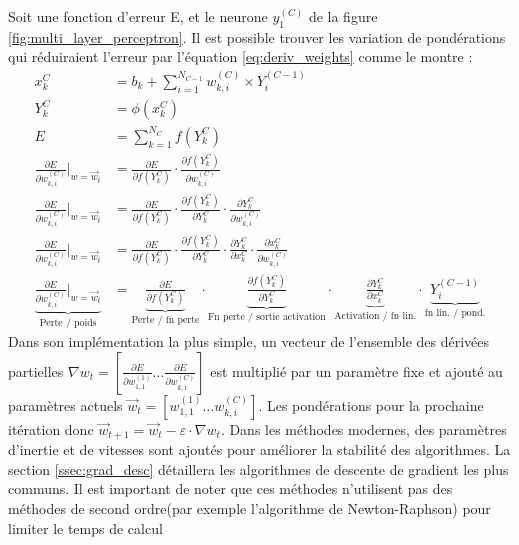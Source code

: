      Soit une fonction d'erreur E, et le neurone $ y^{(C)}_1 $ de la figure \ref{fig:multi_layer_perceptron}. Il est possible trouver les variation de pondérations qui réduiraient l'erreur par l'équation \ref{eq:deriv_weights} comme le montre \textcite{Rumelhart:LearningRepresentations:1986}:
      \begin{align}
        x^{C}_k &= b_k + \sum_{i=1}^{N_{C-1}} w^{(C)}_{k,i} \times Y^{(C-1)}_i\\
        Y^{C}_k &= \phi(x^{C}_k)\\
        E &= \sum^{N_C}_{k=1} f(Y^{C}_k)\\
        \frac{\partial{E}}{\partial{w^{(C)}_{k,i}}}\bigg|_{w=\overrightarrow{w}_{t}} &= \frac{\partial{E}}{\partial{f(Y^{C}_k)}} \cdot \frac{\partial{f(Y^{C}_k)}}{\partial{w^{(C)}_{k,i}}}\\
        \frac{\partial{E}}{\partial{w^{(C)}_{k,i}}}\bigg|_{w=\overrightarrow{w}_{t}} &= \frac{\partial{E}}{\partial{f(Y^{C}_k)}} \cdot \frac{\partial{f(Y^{C}_k)}}{\partial{Y^{C}_k}} \cdot \frac{\partial{Y^{C}_k}}{\partial{w^{(C)}_{k,i}}} \\
        \frac{\partial{E}}{\partial{w^{(C)}_{k,i}}}\bigg|_{w=\overrightarrow{w}_{t}} &= \frac{\partial{E}}{\partial{f(Y^{C}_k)}} \cdot \frac{\partial{f(Y^{C}_k)}}{\partial{Y^{C}_k}} \cdot \frac{\partial{Y^{C}_k}}{\partial{x^{C}_k}} \cdot \frac{\partial{x^{C}_k}}{\partial{w^{(C)}_{k,i}}}\\
        \underbrace{\frac{\partial{E}}{\partial{w^{(C)}_{k,i}}}\bigg|_{w=\overrightarrow{w}_{t}}}_\text{Perte / poids} &= \underbrace{\frac{\partial{E}}{\partial{f(Y^{C}_k)}}}_\text{Perte / fn perte} \cdot \underbrace{\frac{\partial{f(Y^{C}_k)}}{\partial{Y^{C}_k}}}_\text{Fn perte / sortie activation} \cdot \underbrace{\frac{\partial{Y^{C}_k}}{\partial{x^{C}_k}}}_\text{Activation / fn lin.} \cdot \underbrace{Y^{(C-1)}_i}_\text{fn lin. / pond.}\label{eq:deriv_weights}
      \end{align}
    Dans son implémentation la plus simple, un vecteur de l'ensemble des dérivées partielles $\nabla{w_{t}} = \left[ \frac{\partial{E}}{\partial{w^{(1)}_{1,1}}} \ldots \frac{\partial{E}}{\partial{w^{(C)}_{k,i}}} \right] $ est multiplié par un paramètre fixe et ajouté au paramètres actuels $\overrightarrow{w}_{t} = \left[w^{(1)}_{1,1} \ldots w^{(C)}_{k,i}  \right] $. Les pondérations pour la prochaine itération donc $\overrightarrow{w}_{t+1} = \overrightarrow{w}_{t} - \varepsilon \cdot \nabla{w_{t}} $. Dans les méthodes modernes, des paramètres d'inertie et de vitesses sont ajoutés pour améliorer la stabilité des algorithmes. La section \ref{ssec:grad_desc} détaillera les algorithmes de descente de gradient les plus communs. Il est important de noter que ces méthodes n'utilisent pas des méthodes de second ordre(par exemple l'algorithme de Newton-Raphson) pour limiter le temps de calcul 
